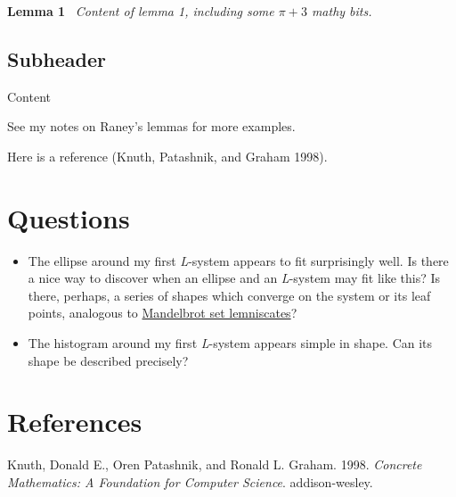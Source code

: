 \documentclass[]{article}
\begin{document}
\textbf{Lemma 1}~ \emph{Content of lemma 1, including some \(\pi+3\)
mathy bits.}

\subsection{Subheader}\label{subheader}

Content

See my notes on Raney's lemmas for more examples.

Here is a reference (Knuth, Patashnik, and Graham 1998).

\section{Questions}\label{questions}

\begin{itemize}
\itemsep1pt\parskip0pt
\item
  The ellipse around my first \emph{L}-system appears to fit
  surprisingly well. Is there a nice way to discover when an ellipse and
  an \emph{L}-system may fit like this? Is there, perhaps, a series of
  shapes which converge on the system or its leaf points, analogous to
  \href{http://mathworld.wolfram.com/MandelbrotSetLemniscate.html}{Mandelbrot
  set lemniscates}?
\item
  The histogram around my first \emph{L}-system appears simple in shape.
  Can its shape be described precisely?
\end{itemize}

\section*{References}\label{references}

Knuth, Donald E., Oren Patashnik, and Ronald L. Graham. 1998.
\emph{Concrete Mathematics: A Foundation for Computer Science}.
addison-wesley.
\end{document}

